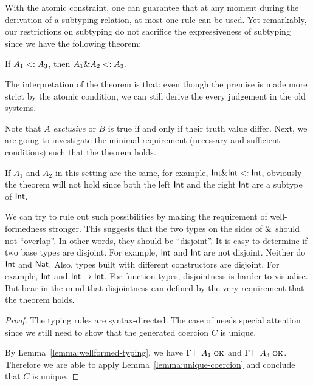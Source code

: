 With the atomic constraint, one can guarantee that at any moment during the
derivation of a subtyping relation, at most one rule can be used. Yet
remarkably, our restrictions on subtyping do not sacrifice the expressiveness of
subtyping since we have the following theorem:
\begin{theorem}
  If $A_1 \subtype A_3$, then $A_1 \inter A_2 \subtype A_3$.
\end{theorem}

The interpretation of the theorem is that: even though the premise is made more
strict by the atomic condition, we can still derive the every judgement in the
old systems. 

Note that $A$ \emph{exclusive} or $B$ is true if and only if their truth value
differ. Next, we are going to investigate the minimal requirement (necessary and
sufficient conditions) such that the theorem holds.

If $A_1$ and $A_2$ in this setting are the same, for example,
$\tyint \inter \tyint \subtype \tyint$, obviously the theorem will
not hold since both the left $\tyint$ and the right $\tyint$ are a
subtype of $\tyint$.

We can try to rule out such possibilities by making the requirement of
well-formedness stronger. This suggests that the two types on the sides of
$\inter$ should not ``overlap''. In other words, they should be ``disjoint''. It
is easy to determine if two base types are disjoint. For example, $\tyint$
and $\tyint$ are not disjoint. Neither do $\tyint$ and $\code{Nat}$.
Also, types built with different constructors are disjoint. For example,
$\tyint$ and $\tyint \to \tyint$. For function types, disjointness
is harder to visualise. But bear in the mind that disjointness can defined by
the very requirement that the theorem holds.

\uniqueelaboration*

\begin{proof}
  The typing rules are syntax-directed. The case of  needs special attention since we still need to show that the generated coercion $C$ is unique.
  \begin{mathpar}
  \end{mathpar}
  By Lemma~\ref{lemma:wellformed-typing}, we have $\jwf \Gamma {A_1}$ and $\jwf \Gamma {A_3}$. Therefore we are able to apply Lemma~\ref{lemma:unique-coercion} and conclude that $C$ is unique.
\end{proof}
